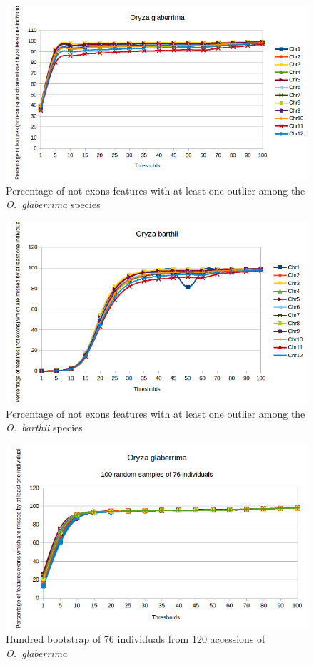 \documentclass[10pt,letterpaper]{article}
\begin{document}
\begin{figure}
\centering
 \includegraphics[scale=0.7]{determinationSeuilsJusqua100MSU7R_NotEx_Og.png}
 \caption{Percentage of not exons features with at least one outlier among the \emph{O.~glaberrima} species}
 \label{SeuilsNE_OG}
\end{figure}

\begin{figure}
\centering
 \includegraphics[scale=0.7]{determinationSeuilsJusqua100MSU7R_NotEx_Ob.png}
 \caption{Percentage of not exons features with at least one outlier among the \emph{O.~barthii} species}
 \label{SeuilsNE_OB}
\end{figure}

\begin{figure}
\centering
 \includegraphics[scale=0.7]{determinationSeuilBootstrapGlabExF.png}
 \caption{Hundred bootstrap of 76 individuals from 120 accessions of \emph{O.~glaberrima}}
 \label{BootstrapOG}
\end{figure}
\end{document}
